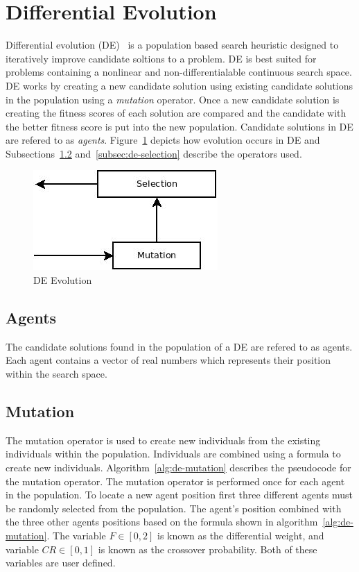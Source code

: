 \section{Differential Evolution}
\label{sec:de}

Differential evolution (DE)~\cite{storn1997differential} is a population based search heuristic designed to iteratively improve candidate soltions to a problem. DE is best suited for problems containing a nonlinear and non-differentialable continuous search space. DE works by creating a new candidate solution using existing candidate solutions in the population using a \textit{mutation} operator. Once a new candidate solution is creating the fitness scores of each solution are compared and the candidate with the better fitness score is put into the new population. Candidate solutions in DE are refered to as \textit{agents}. Figure~\ref{fig:deFlowchart} depicts how evolution occurs in DE and Subsections~\ref{subsec:de-mutation} and~\ref{subsec:de-selection} describe the operators used.

\begin{figure}[H]
  \centering
  \includegraphics[bb=0 0 266 144,scale=0.5]{figures/DE.jpeg}
  \caption{DE Evolution}
  \label{fig:deFlowchart}
\end{figure}

\subsection{Agents}

The candidate solutions found in the population of a DE are refered to as agents. Each agent contains a vector of real numbers which represents their position within the search space.

\subsection{Mutation}
\label{subsec:de-mutation}

The mutation operator is used to create new individuals from the existing individuals within the population. Individuals are combined using a formula to create new individuals. Algorithm~\ref{alg:de-mutation} describes the pseudocode for the mutation operator. The mutation operator is performed once for each agent in the population. To locate a new agent position first three different agents must be randomly selected from the population. The agent's position combined with the three other agents positions based on the formula shown in algorithm~\ref{alg:de-mutation}. The variable $F \in [0,2]$ is known as the differential weight, and variable $CR \in [0,1]$ is known as the crossover probability. Both of these variables are user defined.

